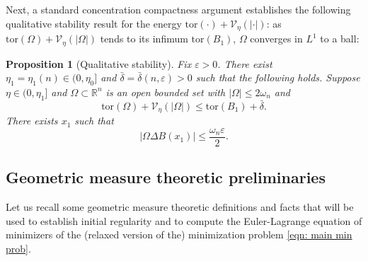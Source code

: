 \documentclass[10pt,a4paper]{amsart}
\numberwithin{equation}{section}
\newtheorem{proposition}[theorem]{Proposition}
\def\R{{\mathbb R}}
\def\e{\varepsilon}
\def\W{\Omega}
\def\tor{\mathrm{tor}}
\def\vpar{\eta}
\def\fv{\mathscr{V}_{\vpar}}
\def\ccdel{\bar{\delta}}
\begin{document}
Next, a standard concentration compactness argument establishes the following qualitative stability result for the energy $\tor(\cdot) +  \mathscr{V}_\eta(|\cdot|)$: as $\tor(\W) +  \mathscr{V}_\eta(|\W|)$ tends to its infimum $\tor(B_1)$, $\Omega$ converges in $L^1$ to a ball:
 \begin{proposition}[Qualitative stability]
 	\label{lemma: qual stability}
 	Fix $\e>0$. There exist $\eta_1={\eta}_1(n)\in (0,\eta_0]$ and $\ccdel = \ccdel(n,\e)>0$ such that the following holds. Suppose  $\eta \in (0, \eta_1]$ and $\W\subset\R^n$ is an open bounded set with $|\W|\leq 2\omega_n$ and 
 	\begin{equation}
 		\label{eqn: small base energy}
 	\tor(\W) +\fv(|\W|) \leq \tor(B_1) + \ccdel.
 	 	\end{equation}
 	There exists $x_1$ such that
 	\begin{equation}
 		\label{eqn: qual stab}
 	|\W \Delta B(x_1) | \leq \frac{\omega_n\e}{2}.
 		\end{equation}
 \end{proposition}



%

\subsection{Geometric measure theoretic preliminaries} Let us recall some geometric measure theoretic definitions and facts that will be used to establish initial regularity and to compute the Euler-Lagrange equation of minimizers of the (relaxed version of the) minimization problem \eqref{eqn: main min prob}.
\end{document}
